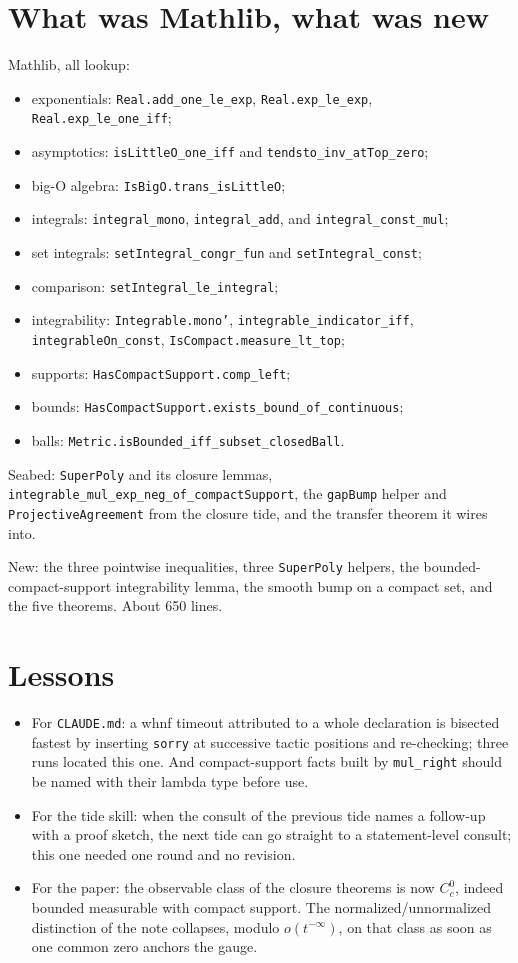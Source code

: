 \documentclass[11pt]{article}
\newcommand{\code}[1]{\texttt{#1}}
\begin{document}
\section{What was Mathlib, what was new}

Mathlib, all lookup:
\begin{itemize}
\item exponentials: \code{Real.add\_one\_le\_exp}, \code{Real.exp\_le\_exp},
\code{Real.exp\_le\_one\_iff};
\item asymptotics: \code{isLittleO\_one\_iff} and
\code{tendsto\_inv\_atTop\_zero};
\item big-O algebra: \code{IsBigO.trans\_isLittleO};
\item integrals: \code{integral\_mono}, \code{integral\_add}, and
\code{integral\_const\_mul};
\item set integrals: \code{setIntegral\_congr\_fun} and
\code{setIntegral\_const};
\item comparison: \code{setIntegral\_le\_integral};
\item integrability: \code{Integrable.mono'}, \code{integrable\_indicator\_iff},
\code{integrableOn\_const}, \code{IsCompact.measure\_lt\_top};
\item supports: \code{HasCompactSupport.comp\_left};
\item bounds: \code{HasCompactSupport.exists\_bound\_of\_continuous};
\item balls: \code{Metric.isBounded\_iff\_subset\_closedBall}.
\end{itemize}

Seabed: \code{SuperPoly} and its closure lemmas,
\code{integrable\_mul\_exp\_neg\_of\_compactSupport}, the \code{gapBump}
helper and \code{ProjectiveAgreement} from the closure tide, and the
transfer theorem it wires into.

New: the three pointwise inequalities, three \code{SuperPoly} helpers,
the bounded-compact-support integrability lemma, the smooth bump on a
compact set, and the five theorems. About 650 lines.

\section{Lessons}

\begin{itemize}
\item For \code{CLAUDE.md}: a whnf timeout attributed to a whole
declaration is bisected fastest by inserting \code{sorry} at successive
tactic positions and re-checking; three runs located this one. And
compact-support facts built by \code{mul\_right} should be named with
their lambda type before use.
\item For the tide skill: when the consult of the previous tide names
a follow-up with a proof sketch, the next tide can go straight to a
statement-level consult; this one needed one round and no revision.
\item For the paper: the observable class of the closure theorems is now
$C_c^0$, indeed bounded measurable with compact support. The
normalized/unnormalized distinction of the note collapses, modulo
$o(t^{-\infty})$, on that class as soon as one common zero anchors the
gauge.
\end{itemize}
\end{document}
